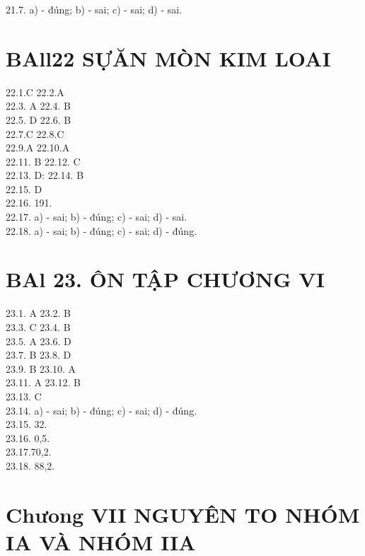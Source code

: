 \documentclass[10pt]{article}
\begin{document}
21.7. a) - đúng; b) - sai; c) - sai; d) - sai.

\section*{BAll22 SỰĂN MÒN KIM LOAI}
22.1.C 22.2.A\\
22.3. A 22.4. B\\
22.5. D 22.6. B\\
22.7.C 22.8.C\\
22.9.A 22.10.A\\
22.11. B 22.12. C\\
22.13. D: 22.14. B\\
22.15. D\\
22.16. 191.\\
22.17. a) - sai; b) - đúng; c) - sai; d) - sai.\\
22.18. a) - sai; b) - đúng; c) - sai; d) - đúng.

\section*{BAl 23. ÔN TẬP CHƯƠNG VI}
23.1. A 23.2. B\\
23.3. C 23.4. B\\
23.5. A 23.6. D\\
23.7. B 23.8. D\\
23.9. B 23.10. A\\
23.11. A 23.12. B\\
23.13. C\\
23.14. a) - sai; b) - đúng; c) - sai; d) - đúng.\\
23.15. 32.\\
23.16. 0,5.\\
23.17.70,2.\\
23.18. 88,2.

\section*{Chưong VII NGUYÊN TO NHÓM IA VÀ NHÓM IIA}
\end{document}
